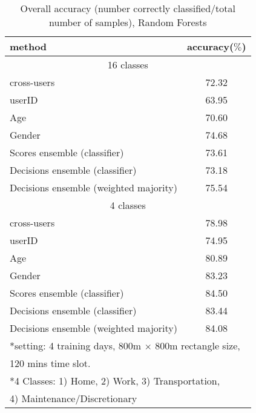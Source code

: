 \documentclass{sig-alternate}
\begin{document}
 \begin{table}[ htb]
 \small
\caption{Overall accuracy (number correctly classified/total number of samples), Random Forests}\label{table:freq_type}
\label{table_result}
\centering
\begin{tabular}{l c   }
\toprule
method  & accuracy($\%$)    \\
\hline
 \multicolumn{2}{c}{16 classes }\\
\hline
cross-users 				 	&  72.32 \\
userID			 		 	&  63.95  \\
Age						 	&  70.60 \\
Gender				 	 	&  74.68 \\
Scores ensemble (classifier)		 	&  73.61 \\
Decisions ensemble (classifier)			& 73.18 \\
Decisions ensemble	(weighted majority)   &  75.54 \\
\hline
 \multicolumn{2}{c}{4 classes }\\
\hline
cross-users  					& 78.98\\
userID					        & 74.95\\
Age							& 80.89\\
Gender						& 83.23\\
Scores ensemble (classifier)		& 84.50\\
Decisions ensemble (classifier)		& 83.44\\
Decisions ensemble (weighted majority)         & 84.08\\
\hline
 \bottomrule
 \multicolumn{2}{l}{*setting: 4 training days, 800m $\times$ 800m rectangle size,  }\\
  \multicolumn{2}{l}{120 mins time slot.  }\\
  \multicolumn{2}{l}{*4 Classes: 1) \textsf{Home}, 2) \textsf{Work}, 3) \textsf{Transportation},  }\\
  \multicolumn{2}{l}{ 4) \textsf{Maintenance/Discretionary}}\\
\end{tabular}\label{table:fusionlevel16and4}
\end{table}
\end{document}
